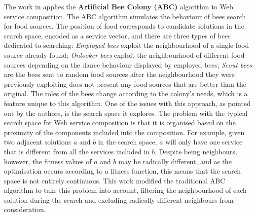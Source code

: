 The work in \cite{zhang2010qos} applies the \textbf{Artificial Bee Colony (ABC)} algorithm to Web service composition. The ABC algorithm simulates the behaviour of bees search for food sources. The position of food corresponds to candidate solutions in the search space, encoded as a service vector, and there are three types of bees dedicated to searching: \textit{Employed bees} exploit the neighbourhood of a single food source already found; \textit{Onlooker bees} exploit the neighbourhood of different food sources depending on the dance behaviour displayed by employed bees; \textit{Scout bees} are the bees sent to random food sources after the neighbourhood they were previously exploiting does not present any food sources that are better than the original. The roles of the bees change according to the colony's needs, which is a feature unique to this algorithm. One of the issues with this approach, as pointed out by the authors, is the search space it explores. The problem with the typical search space for Web service composition is that it is organised based on the proximity of the components included into the composition. For example, given two adjacent solutions $a$ and $b$ in the search space, $a$ will only have one service that is different from all the services included in $b$. Despite being neighbours, however, the fitness values of $a$ and $b$ may be radically different, and as the optimisation occurs according to a fitness function, this means that the search space is not entirely continuous. This work modified the traditional ABC algorithm to take this problem into account, filtering the neighbourhood of each solution during the search and excluding radically different neighbours from consideration.

